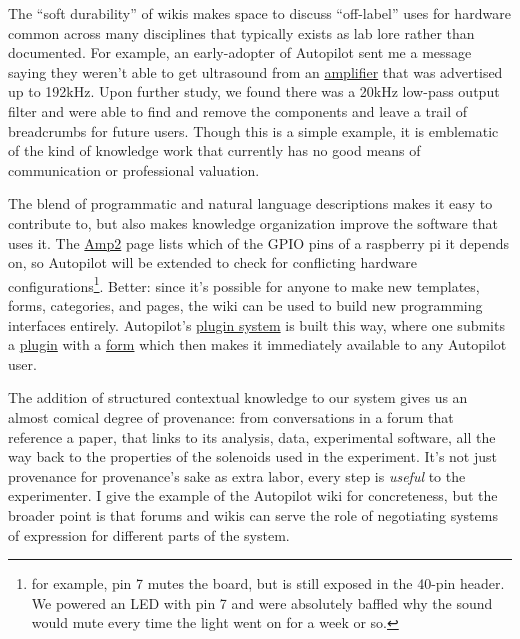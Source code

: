 \documentclass[notoc]{tufte-book}
\begin{document}
The ``soft durability'' of wikis makes space to discuss ``off-label''
uses for hardware common across many disciplines that typically exists
as lab lore rather than documented. For example, an early-adopter of
Autopilot sent me a message saying they weren't able to get ultrasound
from an
\href{https://wiki.auto-pi-lot.com/index.php/HiFiBerry_Amp2}{amplifier}
that was advertised up to 192kHz. Upon further study, we found there was
a 20kHz low-pass output filter and were able to find and remove the
components and leave a trail of breadcrumbs for future users. Though
this is a simple example, it is emblematic of the kind of knowledge work
that currently has no good means of communication or professional
valuation.

The blend of programmatic and natural language descriptions makes it
easy to contribute to, but also makes knowledge organization improve the
software that uses it. The
\href{https://wiki.auto-pi-lot.com/index.php/HiFiBerry_Amp2}{Amp2} page
lists which of the GPIO pins of a raspberry pi it depends on, so
Autopilot will be extended to check for conflicting hardware
configurations\footnote{for example, pin 7 mutes the board, but is still
  exposed in the 40-pin header. We powered an LED with pin 7 and were
  absolutely baffled why the sound would mute every time the light went
  on for a week or so.}. Better: since it's possible for anyone to make
new templates, forms, categories, and pages, the wiki can be used to
build new programming interfaces entirely. Autopilot's
\href{https://docs.auto-pi-lot.com/en/latest/guide/plugins.html}{plugin
system} is built this way, where one submits a
\href{https://wiki.auto-pi-lot.com/index.php/Autopilot_Plugins}{plugin}
with a
\href{https://wiki.auto-pi-lot.com/index.php/Form:Autopilot_Plugin}{form}
which then makes it immediately available to any Autopilot user.

The addition of structured contextual knowledge to our system gives us
an almost comical degree of provenance: from conversations in a forum
that reference a paper, that links to its analysis, data, experimental
software, all the way back to the properties of the solenoids used in
the experiment. It's not just provenance for provenance's sake as extra
labor, every step is \emph{useful} to the experimenter. I give the
example of the Autopilot wiki for concreteness, but the broader point is
that forums and wikis can serve the role of negotiating systems of
expression for different parts of the system.
\end{document}

